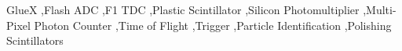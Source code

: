 \begin{keyword}
GlueX \sep Flash ADC \sep F1 TDC \sep Plastic Scintillator \sep Silicon Photomultiplier \sep Multi-Pixel Photon Counter \sep Time of Flight \sep Trigger \sep Particle Identification \sep Polishing Scintillators
\end{keyword}